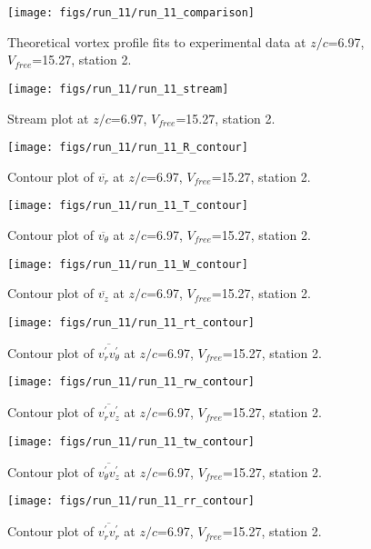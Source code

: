\begin{figure}[H]
\centering
\texttt{[image: figs/run\_11/run\_11\_comparison]}
\caption{Theoretical vortex profile fits to experimental data at $z/c$=6.97, $V_{free}$=15.27, station 2.}
\end{figure}


\begin{figure}[H]
\centering
\texttt{[image: figs/run\_11/run\_11\_stream]}
\caption{Stream plot at $z/c$=6.97, $V_{free}$=15.27, station 2.}
\end{figure}


\begin{figure}[H]
\centering
\texttt{[image: figs/run\_11/run\_11\_R\_contour]}
\caption{Contour plot of $\overline{v_{r}}$ at $z/c$=6.97, $V_{free}$=15.27, station 2.}
\end{figure}


\begin{figure}[H]
\centering
\texttt{[image: figs/run\_11/run\_11\_T\_contour]}
\caption{Contour plot of $\overline{v_{\theta}}$ at $z/c$=6.97, $V_{free}$=15.27, station 2.}
\end{figure}


\begin{figure}[H]
\centering
\texttt{[image: figs/run\_11/run\_11\_W\_contour]}
\caption{Contour plot of $\overline{v_{z}}$ at $z/c$=6.97, $V_{free}$=15.27, station 2.}
\end{figure}


\begin{figure}[H]
\centering
\texttt{[image: figs/run\_11/run\_11\_rt\_contour]}
\caption{Contour plot of $\overline{v_{r}^{\prime} v_{\theta}^{\prime}}$ at $z/c$=6.97, $V_{free}$=15.27, station 2.}
\end{figure}


\begin{figure}[H]
\centering
\texttt{[image: figs/run\_11/run\_11\_rw\_contour]}
\caption{Contour plot of $\overline{v_{r}^{\prime} v_{z}^{\prime}}$ at $z/c$=6.97, $V_{free}$=15.27, station 2.}
\end{figure}


\begin{figure}[H]
\centering
\texttt{[image: figs/run\_11/run\_11\_tw\_contour]}
\caption{Contour plot of $\overline{v_{\theta}^{\prime} v_{z}^{\prime}}$ at $z/c$=6.97, $V_{free}$=15.27, station 2.}
\end{figure}


\begin{figure}[H]
\centering
\texttt{[image: figs/run\_11/run\_11\_rr\_contour]}
\caption{Contour plot of $\overline{v_{r}^{\prime} v_{r}^{\prime}}$ at $z/c$=6.97, $V_{free}$=15.27, station 2.}
\end{figure}


